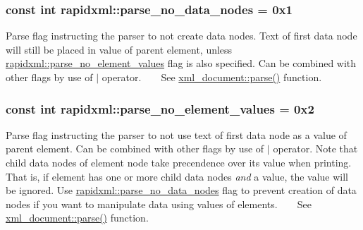\subsubsection[{parse\+\_\+no\+\_\+data\+\_\+nodes}]{\setlength{\rightskip}{0pt plus 5cm}const int rapidxml\+::parse\+\_\+no\+\_\+data\+\_\+nodes = 0x1}\label{namespacerapidxml_ac2d21ef14a4e8936b94aca5d38b1a74d}
Parse flag instructing the parser to not create data nodes. Text of first data node will still be placed in value of parent element, unless \hyperlink{namespacerapidxml_a00e6fea134b786ea6efeed1c8bc4a668}{rapidxml\+::parse\+\_\+no\+\_\+element\+\_\+values} flag is also specified. Can be combined with other flags by use of $\vert$ operator. ~\newline
~\newline
 See \hyperlink{classrapidxml_1_1xml__document_ac6e73ff9ac323bf5a370c38feb03a6b1}{xml\+\_\+document\+::parse()} function. \hypertarget{namespacerapidxml_a00e6fea134b786ea6efeed1c8bc4a668}{}
\subsubsection[{parse\+\_\+no\+\_\+element\+\_\+values}]{\setlength{\rightskip}{0pt plus 5cm}const int rapidxml\+::parse\+\_\+no\+\_\+element\+\_\+values = 0x2}\label{namespacerapidxml_a00e6fea134b786ea6efeed1c8bc4a668}
Parse flag instructing the parser to not use text of first data node as a value of parent element. Can be combined with other flags by use of $\vert$ operator. Note that child data nodes of element node take precendence over its value when printing. That is, if element has one or more child data nodes {\itshape and} a value, the value will be ignored. Use \hyperlink{namespacerapidxml_ac2d21ef14a4e8936b94aca5d38b1a74d}{rapidxml\+::parse\+\_\+no\+\_\+data\+\_\+nodes} flag to prevent creation of data nodes if you want to manipulate data using values of elements. ~\newline
~\newline
 See \hyperlink{classrapidxml_1_1xml__document_ac6e73ff9ac323bf5a370c38feb03a6b1}{xml\+\_\+document\+::parse()} function. \hypertarget{namespacerapidxml_a89113c103ffaf77615d1aa330c8dcca8}{}
